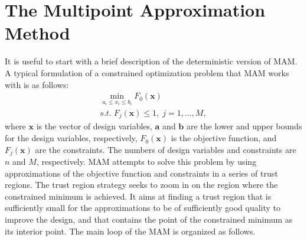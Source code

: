 \documentclass[10pt,twocolumn,a4paper]{article}
\begin{document}
\section{The Multipoint Approximation Method}
\label{sec:MAM}

It is useful to start with a brief description of the deterministic version of MAM. A typical formulation of a constrained optimization problem that MAM works with is as follows:
\begin{equation}
  \label{eq:problem}
  \begin{array}{c}
  \min\limits_{a_i \le x_i \le b_i}F_0(\pmb x) \\
  s.t.\; F_j(\pmb x) \le 1,\; j=1,\dots ,M,
  \end{array}
\end{equation}
where $\pmb x$ is the vector of design variables, $\pmb a$ and $\pmb b$ are the lower and upper bounds for the design variables, respectively, $F_0(\pmb x)$ is the objective function, and $F_j(\pmb x)$ are the constraints. The numbers of design variables and constraints are $n$ and $M$, respectively. MAM attempts to solve this problem by using approximations of the objective function and constraints in a series of trust regions. The trust region strategy seeks to zoom in on the region where the constrained minimum is achieved. It aims at finding a trust region that is sufficiently small for the approximations to be of sufficiently good quality to improve the design, and that contains the point of the constrained minimum as its interior point. The main loop of the MAM is organized as follows.
\end{document}
